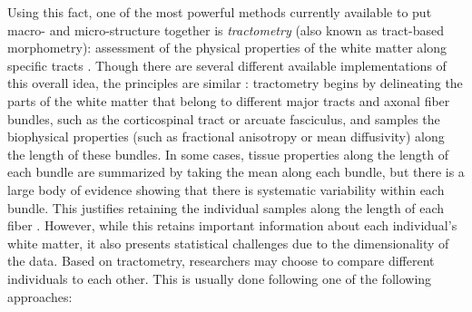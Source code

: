 Using this fact, one of the most powerful methods currently available to put
macro- and micro-structure together is \emph{tractometry} (also known as
tract-based morphometry): assessment of the physical properties of the white
matter along specific tracts \cite{Bells2011-cf}. Though there are several
different available implementations of this overall idea, the principles are
similar \cite{yeatman2012, Yendiki2011-ay, Wassermann2016-iv, ODonnell2009-uu}:
tractometry begins by delineating the parts of the white matter that belong to
different major tracts and axonal fiber bundles, such as the corticospinal tract
or arcuate fasciculus, and samples the biophysical properties (such as
fractional anisotropy or mean diffusivity) along the length of these bundles. In
some cases, tissue properties along the length of each bundle are summarized by
taking the mean along each bundle, but there is a large body of evidence showing
that there is systematic variability within each bundle. This justifies
retaining the individual samples along the length of each fiber
\cite{yeatman2012, colby2012, ODonnell2009-uu}. However, while this retains
important information about each individual's white matter, it also presents
statistical challenges due to the dimensionality of the data. Based on
tractometry, researchers may choose to compare different individuals to each
other. This is usually done following one of the following approaches:

